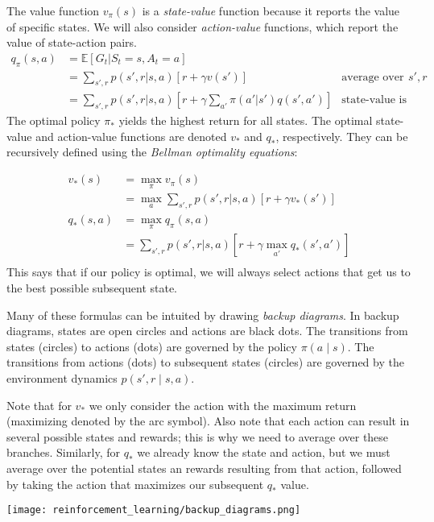 The value function $v_\pi(s)$ is a \textit{state-value} function because it reports the value of specific states. We will also consider \textit{action-value} functions, which report the value of state-action pairs.
\begin{align*}
q_\pi(s,a) &= \mathbb{E}[G_t | S_t=s, A_t=a] \\
&= \sum_{s',r} p(s', r | s, a) [r + \gamma v(s')] & \scriptstyle{\text{average over potential $s',r$}} \\
&= \sum_{s',r} p(s', r | s, a) [r + \gamma \sum_{a'} \pi(a' | s') q(s', a')] & \scriptstyle{\text{state-value is average over action-values}}
\end{align*}
The optimal policy $\pi_*$ yields the highest return for all states. The optimal state-value and action-value functions are denoted $v_*$ and $q_*$, respectively. They can be recursively defined using the \textit{Bellman optimality equations}:


\begin{align*}
v_*(s) &= \max_\pi v_\pi(s) \\
&= \max_a \sum_{s', r} p(s',r | s,a) [r + \gamma v_*(s')] \\
q_*(s,a) &= \max_\pi q_\pi(s,a) \\
&= \sum_{s', r} p(s',r | s,a) [r + \gamma \max_{a'} q_*(s', a')] \\
\end{align*}
This says that if our policy is optimal, we will always select actions that get us to the best possible subsequent state.

Many of these formulas can be intuited by drawing \textit{backup diagrams}. In backup diagrams, states are open circles and actions are black dots. The transitions from states (circles) to actions (dots) are governed by the policy $\pi(a \mid s)$. The transitions from actions (dots) to subsequent states (circles) are governed by the environment dynamics $p(s',r \mid s,a)$. 

Note that for $v_*$ we only consider the action with the maximum return (maximizing denoted by the arc symbol). Also note that each action can result in several possible states and rewards; this is why we need to average over these branches. Similarly, for $q_*$ we already know the state and action, but we must average over the potential states an rewards resulting from that action, followed by taking the action that maximizes our subsequent $q_*$ value.

\begin{center}\texttt{[image: reinforcement\_learning/backup\_diagrams.png]}\end{center}

